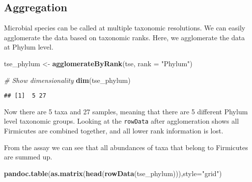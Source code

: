 \documentclass[
  oneside]{book}
\newenvironment{Shaded}{\begin{snugshade}}{\end{snugshade}}
\newcommand{\CommentTok}[1]{\textcolor[rgb]{0.56,0.35,0.01}{\textit{#1}}}
\newcommand{\DataTypeTok}[1]{\textcolor[rgb]{0.13,0.29,0.53}{#1}}
\newcommand{\KeywordTok}[1]{\textcolor[rgb]{0.13,0.29,0.53}{\textbf{#1}}}
\newcommand{\NormalTok}[1]{#1}
\newcommand{\StringTok}[1]{\textcolor[rgb]{0.31,0.60,0.02}{#1}}
\begin{document}
\hypertarget{aggregation}{%
\subsection{Aggregation}\label{aggregation}}

Microbial species can be called at multiple taxonomic resolutions. We
can easily agglomerate the data based on taxonomic ranks. Here, we
agglomerate the data at Phylum level.

\begin{Shaded}
\begin{Highlighting}[]
\NormalTok{tse_phylum <-}\StringTok{ }\KeywordTok{agglomerateByRank}\NormalTok{(tse, }\DataTypeTok{rank =} \StringTok{"Phylum"}\NormalTok{)}

\CommentTok{# Show dimensionality}
\KeywordTok{dim}\NormalTok{(tse_phylum)}
\end{Highlighting}
\end{Shaded}

\begin{verbatim}
## [1]  5 27
\end{verbatim}

Now there are 5 taxa and 27
samples, meaning that there are 5 different
Phylum level taxonomic groups. Looking at the \texttt{rowData} after
agglomeration shows all Firmicutes are combined together, and all
lower rank information is lost.

From the assay we can see that all abundances of taxa that belong to
Firmicutes are summed up.

\begin{Shaded}
\begin{Highlighting}[]
\KeywordTok{pandoc.table}\NormalTok{(}\KeywordTok{as.matrix}\NormalTok{(}\KeywordTok{head}\NormalTok{(}\KeywordTok{rowData}\NormalTok{(tse_phylum))),}\DataTypeTok{style=}\StringTok{"grid"}\NormalTok{)}
\end{Highlighting}
\end{Shaded}
\end{document}
